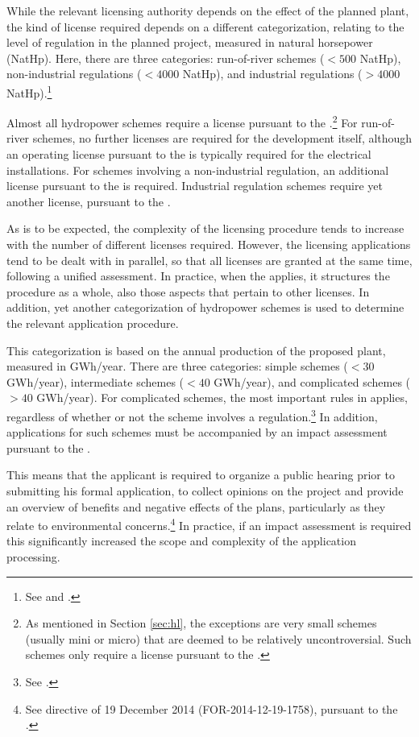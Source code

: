 While the relevant licensing authority depends on the effect of the planned plant, the kind of license required depends on a different categorization, relating to the level of regulation in the planned project, measured in natural horsepower (NatHp). Here, there are three categories: run-of-river schemes  ($< 500$ NatHp), non-industrial regulations ($< 4000$ NatHp), and industrial regulations ($> 4000$ NatHp).\footnote{See \cite[2]{wra17} and \cite[1,2]{ica17}.} %

Almost all hydropower schemes require a license pursuant to the \cite[8]{wra00}.\footnote{As mentioned in Section \ref{sec:hl}, the exceptions are very small schemes (usually mini or micro) that are deemed to be relatively uncontroversial. Such schemes only require a license pursuant to the \cite{pb08}.} For run-of-river schemes, no further licenses are required for the development itself, although an operating license pursuant to the \cite{ea90} is typically required for the electrical installations. For schemes involving a non-industrial regulation, an additional license pursuant to the \cite[8]{wra17} is required. Industrial regulation schemes require yet another license, pursuant to the \cite[2]{ica17}.

As is to be expected, the complexity of the licensing procedure tends to increase with the number of different licenses required. However, the licensing applications tend to be dealt with in parallel, so that all licenses are granted at the same time, following a unified assessment. In practice, when the \cite{wra17} applies, it structures the procedure as a whole, also those aspects that pertain to other licenses. In addition, yet another categorization of hydropower schemes is used to determine the relevant application procedure.

This categorization is based on the annual production of the proposed plant, measured in GWh/year. There are three categories: simple schemes ($< 30$ GWh/year), intermediate schemes ($< 40$ GWh/year), and complicated schemes ($> 40$ GWh/year). For complicated schemes, the most important rules in \cite{wra17} applies, regardless of whether or not the scheme involves a regulation.\footnote{See \cite[19]{wra00}.} In addition, applications for such schemes must be accompanied by an impact assessment pursuant to the \cite[14-6]{pb08}.

This means that the applicant is required to organize a public hearing prior to submitting his formal application, to collect opinions on the project and provide an overview of benefits and negative effects of the plans, particularly as they relate to environmental concerns.\footnote{See directive of 19 December 2014 (FOR-2014-12-19-1758), pursuant to the \cite[1-2,14-6]{pb08}.} In practice, if an impact assessment is required this significantly increased the scope and complexity of the application processing.

